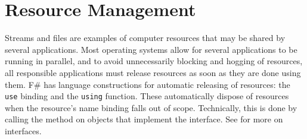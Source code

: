 \documentclass[fsharpNotes.tex]{subfiles}
\begin{document}
\begin{comment}
  \section{Reading From the Internet}
The internet is a global collection of computers that are connected in a network using the internet protocol suite TCP/IP. The internet is commonly used for transport of data such as emails and for offering services such as web pages on the World Wide Web. Web resources are identified by 
a \idx{Uniform Resource Locator} (\idx{URL}), popularly known as a web page, and an URL contains information about where and how data from the web page is to be obtained. E.g.,
\begin{quote}
\lstinline[language=console]!https://en.wikipedia.org/wiki/F_Sharp_(programming_language)!
\end{quote}
contains 3 pieces of information: The host uses the \lstinline[language=console]!https! protocol, \lstinline[language=console]!en.wikipedia.org! is its name, and \lstinline[language=console]!wiki/F_Sharp_(programming_language)! is the filename.

F\#'s \lstinline!System! namespace contains functions for accessing web pages as stream, as illustrated in \Cref{webRequest}.
%
\fs{webRequest}{Downloading a web page and printing the first few characters.}
%
To connect to a URL as a stream, we first need first format the URL string as a \idx{Uniform Resource Identifiers} (\idx{URI}), which is a generalization of the URL concept, using the \lstinline!System.Uri! function. Then we must initialize the request by the \lstinline!System.Net.WebRequest! function, and the response from the host is obtained by the \lstinline!GetResponse! method. Finally, we can access the response as a stream by the \lstinline!GetResponseStream! method. In the end, we convert the stream to a \lstinline!StreamReader!, such that we can use the methods from \Cref{tab:streamReaderMethods} to access the web page. \jon{This section could be extended...}
\end{comment}
\section{Resource Management}
\label{sec:resourceManagement}
Streams and files are examples of computer resources that may be shared by several applications. Most operating systems allow for several applications to be running in parallel, and to avoid unnecessarily blocking and hogging of resources, all responsible applications must release resources as soon as they are done using them. F\# has language constructions for automatic releasing of resources: the \lstinline{use} binding and the \lstinline{using} function. These automatically dispose of resources when the resource's name binding falls out of scope. Technically, this is done by calling the  method on objects that implement the  interface. See  for more on interfaces.
\end{document}
